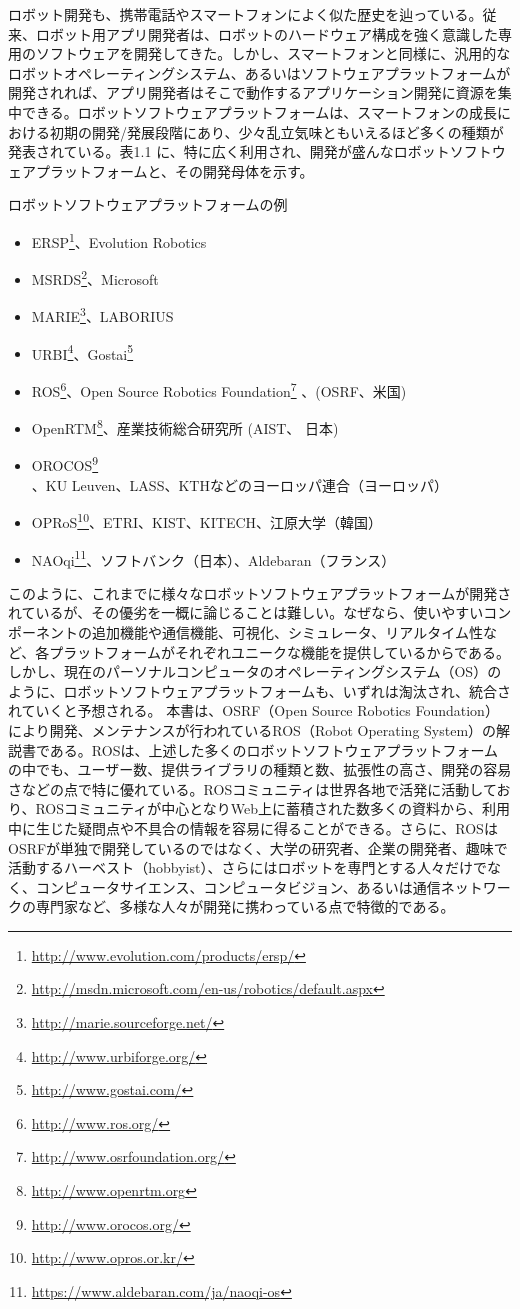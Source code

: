 ロボット開発も、携帯電話やスマートフォンによく似た歴史を辿っている。従来、ロボット用アプリ開発者は、ロボットのハードウェア構成を強く意識した専用のソフトウェアを開発してきた。しかし、スマートフォンと同様に、汎用的なロボットオペレーティングシステム、あるいはソフトウェアプラットフォームが開発されれば、アプリ開発者はそこで動作するアプリケーション開発に資源を集中できる。ロボットソフトウェアプラットフォームは、スマートフォンの成長における初期の開発/発展段階にあり、少々乱立気味ともいえるほど多くの種類が発表されている。表1.1 に、特に広く利用され、開発が盛んなロボットソフトウェアプラットフォームと、その開発母体を示す。

ロボットソフトウェアプラットフォームの例

\begin{itemize}
\item ERSP\footnote{\url{http://www.evolution.com/products/ersp/}}、Evolution Robotics
\item MSRDS\footnote{\url{http://msdn.microsoft.com/en-us/robotics/default.aspx}}、Microsoft
\item MARIE\footnote{\url{http://marie.sourceforge.net/}}、LABORIUS
\item URBI\footnote{\url{http://www.urbiforge.org/}}、Gostai\footnote{\url{http://www.gostai.com/}}
\item ROS\footnote{\url{http://www.ros.org/}}、Open Source Robotics Foundation\footnote{\url{http://www.osrfoundation.org/}} 、(OSRF、米国)
\item OpenRTM\footnote{\url{http://www.openrtm.org}}、産業技術総合研究所 (AIST、 日本)
\item OROCOS\footnote{\url{http://www.orocos.org/}}、KU Leuven、LASS、KTHなどのヨーロッパ連合（ヨーロッパ）
\item OPRoS\footnote{\url{http://www.opros.or.kr/}}、ETRI、KIST、KITECH、江原大学（韓国）
\item NAOqi\footnote{\url{https://www.aldebaran.com/ja/naoqi-os}}、ソフトバンク（日本）、Aldebaran（フランス）
\end{itemize}

このように、これまでに様々なロボットソフトウェアプラットフォームが開発されているが、その優劣を一概に論じることは難しい。なぜなら、使いやすいコンポーネントの追加機能や通信機能、可視化、シミュレータ、リアルタイム性など、各プラットフォームがそれぞれユニークな機能を提供しているからである。しかし、現在のパーソナルコンピュータのオペレーティングシステム（OS）のように、ロボットソフトウェアプラットフォームも、いずれは淘汰され、統合されていくと予想される。
本書は、OSRF（Open Source Robotics Foundation）により開発、メンテナンスが行われているROS（Robot Operating System）の解説書である。ROSは、上述した多くのロボットソフトウェアプラットフォームの中でも、ユーザー数、提供ライブラリの種類と数、拡張性の高さ、開発の容易さなどの点で特に優れている。ROSコミュニティは世界各地で活発に活動しており、ROSコミュニティが中心となりWeb上に蓄積された数多くの資料から、利用中に生じた疑問点や不具合の情報を容易に得ることができる。さらに、ROSはOSRFが単独で開発しているのではなく、大学の研究者、企業の開発者、趣味で活動するハーベスト（hobbyist）、さらにはロボットを専門とする人々だけでなく、コンピュータサイエンス、コンピュータビジョン、あるいは通信ネットワークの専門家など、多様な人々が開発に携わっている点で特徴的である。

